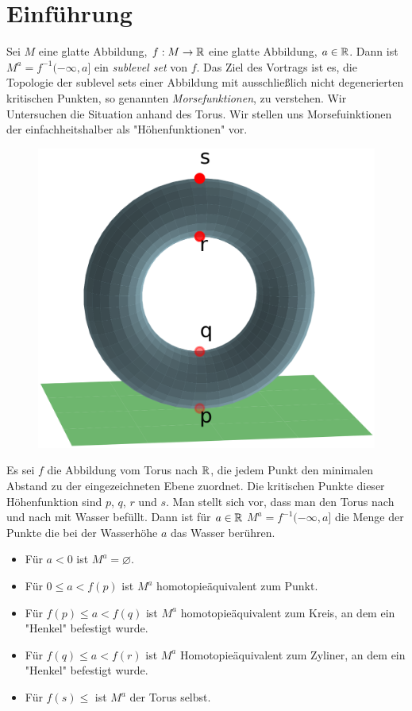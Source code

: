 \section{Einführung}

Sei $M$ eine glatte Abbildung, $f: M \to { \mathbb R }$ eine glatte Abbildung, 
$a \in { \mathbb R }$. Dann ist $M^a = f^{-1}(- \infty, a]$ ein \textit{sublevel set} von 
$f$. Das Ziel des Vortrags ist es, die Topologie der sublevel sets einer 
Abbildung mit ausschließlich nicht degenerierten kritischen Punkten, so genannten
\textit{Morsefunktionen}, zu verstehen.
Wir Untersuchen die Situation anhand des Torus. Wir stellen uns Morsefuinktionen
der einfachheitshalber als "Höhenfunktionen" vor.

\begin{figure}[H]
    \centering
    \includegraphics[width=0.6\linewidth]{resources/Me-Diagram1-torus-plane.png}
    \label{fig:me-diagram1}
\end{figure}

Es sei $f$ die Abbildung vom Torus nach ${ \mathbb R }$, die jedem Punkt den minimalen
Abstand zu der eingezeichneten Ebene zuordnet. 
Die kritischen Punkte dieser Höhenfunktion sind $p$, $q$, $r$ und $s$.
Man stellt sich vor, dass man den Torus nach und nach mit Wasser befüllt. Dann 
ist für $a \in { \mathbb R }$ $M^a = f^{-1}(-\infty, a]$ die Menge der Punkte die bei der
Wasserhöhe $a$ das Wasser berühren. 

\begin{itemize}
    \item Für $a < 0$ ist $M^a = \varnothing$.
    \item Für $0 \leq a < f(p)$ ist $M^a$ homotopieäquivalent zum Punkt.
    \item Für $f(p) \leq a < f(q)$ ist $M^a$ homotopieäquivalent zum Kreis,
        an dem ein "Henkel" befestigt wurde.
    \item Für $f(q) \leq a < f(r)$ ist $M^a$ Homotopieäquivalent zum Zyliner,
        an dem ein "Henkel" befestigt wurde.
    \item Für $f(s) \leq$ ist $M^a$ der Torus selbst.
\end{itemize}

